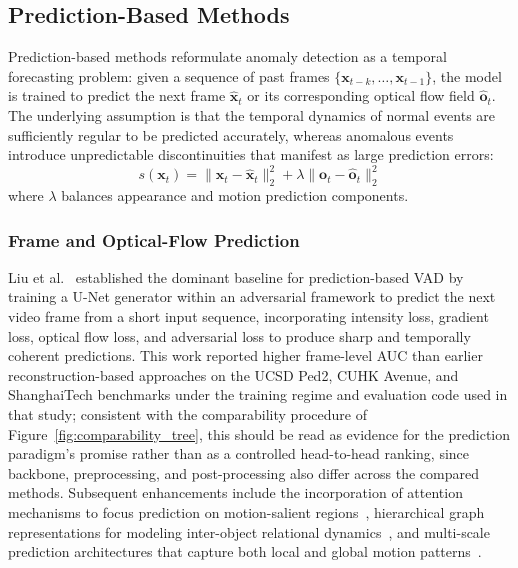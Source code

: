 \documentclass[10pt,a4paper]{article}
\begin{document}
\subsection{Prediction-Based Methods}
\label{subsec:prediction}

Prediction-based methods reformulate anomaly detection as a temporal forecasting problem: given a sequence of past frames $\{\mathbf{x}_{t-k}, \ldots, \mathbf{x}_{t-1}\}$, the model is trained to predict the next frame $\hat{\mathbf{x}}_t$ or its corresponding optical flow field $\hat{\mathbf{o}}_t$. The underlying assumption is that the temporal dynamics of normal events are sufficiently regular to be predicted accurately, whereas anomalous events introduce unpredictable discontinuities that manifest as large prediction errors:
\begin{equation}
    s(\mathbf{x}_t) = \| \mathbf{x}_t - \hat{\mathbf{x}}_t \|_2^2 + \lambda \| \mathbf{o}_t - \hat{\mathbf{o}}_t \|_2^2
    \label{eq:pred_score}
\end{equation}
where $\lambda$ balances appearance and motion prediction components.

\subsubsection{Frame and Optical-Flow Prediction}

Liu et al.~\citeyearpar{liu2018future} established the dominant baseline for prediction-based VAD by training a U-Net generator within an adversarial framework to predict the next video frame from a short input sequence, incorporating intensity loss, gradient loss, optical flow loss, and adversarial loss to produce sharp and temporally coherent predictions. This work reported higher frame-level AUC than earlier reconstruction-based approaches on the UCSD Ped2, CUHK Avenue, and ShanghaiTech benchmarks under the training regime and evaluation code used in that study; consistent with the comparability procedure of Figure~\ref{fig:comparability_tree}, this should be read as evidence for the prediction paradigm's promise rather than as a controlled head-to-head ranking, since backbone, preprocessing, and post-processing also differ across the compared methods. Subsequent enhancements include the incorporation of attention mechanisms to focus prediction on motion-salient regions~\citep{lee2019bman}, hierarchical graph representations for modeling inter-object relational dynamics~\citep{morais2019learning}, and multi-scale prediction architectures that capture both local and global motion patterns~\citep{chang2022video}.
\end{document}
